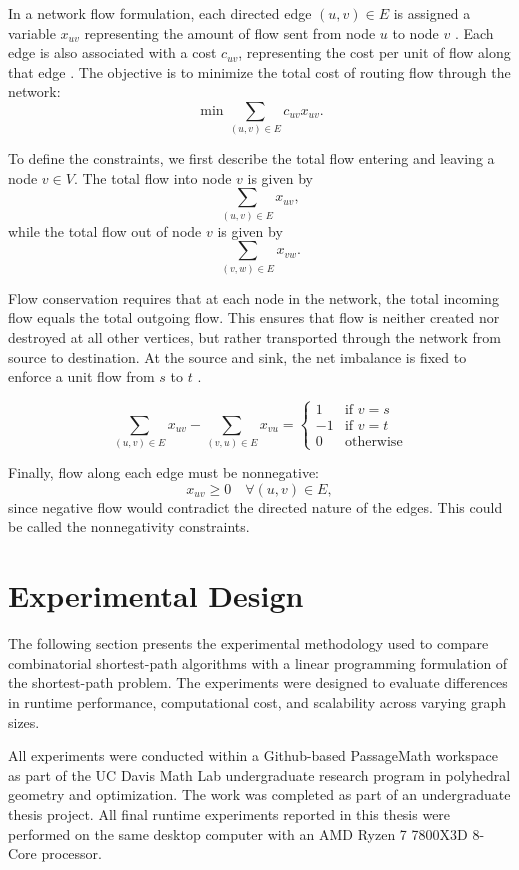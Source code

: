 \documentclass[12pt]{report}
\begin{document}
In a network flow formulation, each directed edge $(u,v) \in E$ is assigned a variable $x_{uv}$ representing the amount of flow sent from node $u$ to node $v$ \cite{Vanderbei}. Each edge is also associated with a cost $c_{uv}$, representing the cost per unit of flow along that edge \cite{Vanderbei}. The objective is to minimize the total cost of routing flow through the network:
\[
\min \sum_{(u,v)\in E} c_{uv} x_{uv}.
\]

To define the constraints, we first describe the total flow entering and leaving a node $v \in V$. The total flow into node $v$ is given by
\[
\sum_{(u,v)\in E} x_{uv},
\]
while the total flow out of node $v$ is given by
\[
\sum_{(v,w)\in E} x_{vw}.
\]

Flow conservation requires that at each node in the network, the total incoming flow equals the total outgoing flow. This ensures that flow is neither created nor destroyed at all other vertices, but rather transported through the network from source to destination. At the source and sink, the net imbalance is fixed to enforce a unit flow from $s$ to $t$ \cite{Vanderbei}.

\[
\sum_{(u,v)\in E} x_{uv} - \sum_{(v,u)\in E} x_{vu} =
\begin{cases}
1 & \text{if } v = s \\
-1 & \text{if } v = t \\
0 & \text{otherwise}
\end{cases}
\]

Finally, flow along each edge must be nonnegative:
\[
x_{uv} \ge 0 \quad \forall (u,v)\in E,
\]
since negative flow would contradict the directed nature of the edges. This could be called the nonnegativity constraints. 



\chapter{Experimental Design}

The following section presents the experimental methodology used to compare combinatorial shortest-path algorithms with a linear programming formulation of the shortest-path problem. The experiments were designed to evaluate differences in runtime performance, computational cost, and scalability across varying graph sizes. 

All experiments were conducted within a Github-based PassageMath workspace as part of the UC Davis Math Lab undergraduate research program in polyhedral geometry and optimization. The work was completed as part of an undergraduate thesis project. All final runtime experiments reported in this thesis were performed on the same desktop computer with an AMD Ryzen 7 7800X3D 8-Core processor.
\end{document}
